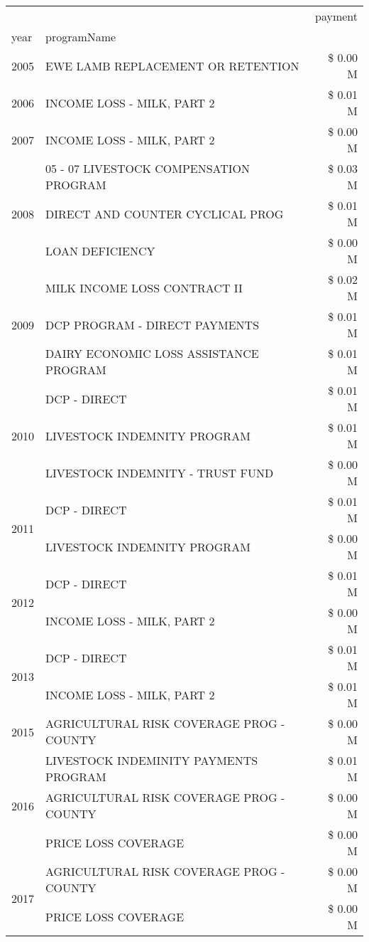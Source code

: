\begin{tabular}{llr}
\toprule
 &  & payment \\
year & programName &  \\
\midrule
2005 & EWE LAMB REPLACEMENT OR RETENTION & \$ 0.00 M \\
\cline{1-3}
2006 & INCOME LOSS - MILK, PART 2 & \$ 0.01 M \\
\cline{1-3}
2007 & INCOME LOSS - MILK, PART 2 & \$ 0.00 M \\
\cline{1-3}
\multirow[t]{3}{*}{2008} & 05 - 07 LIVESTOCK COMPENSATION PROGRAM & \$ 0.03 M \\
 & DIRECT AND COUNTER CYCLICAL PROG & \$ 0.01 M \\
 & LOAN DEFICIENCY & \$ 0.00 M \\
\cline{1-3}
\multirow[t]{3}{*}{2009} & MILK INCOME LOSS CONTRACT II & \$ 0.02 M \\
 & DCP PROGRAM - DIRECT PAYMENTS & \$ 0.01 M \\
 & DAIRY ECONOMIC LOSS ASSISTANCE PROGRAM & \$ 0.01 M \\
\cline{1-3}
\multirow[t]{3}{*}{2010} & DCP - DIRECT & \$ 0.01 M \\
 & LIVESTOCK INDEMNITY PROGRAM & \$ 0.01 M \\
 & LIVESTOCK INDEMNITY - TRUST FUND & \$ 0.00 M \\
\cline{1-3}
\multirow[t]{2}{*}{2011} & DCP - DIRECT & \$ 0.01 M \\
 & LIVESTOCK INDEMNITY PROGRAM & \$ 0.00 M \\
\cline{1-3}
\multirow[t]{2}{*}{2012} & DCP - DIRECT & \$ 0.01 M \\
 & INCOME LOSS - MILK, PART 2 & \$ 0.00 M \\
\cline{1-3}
\multirow[t]{2}{*}{2013} & DCP - DIRECT & \$ 0.01 M \\
 & INCOME LOSS - MILK, PART 2 & \$ 0.01 M \\
\cline{1-3}
2015 & AGRICULTURAL RISK COVERAGE PROG - COUNTY & \$ 0.00 M \\
\cline{1-3}
\multirow[t]{3}{*}{2016} & LIVESTOCK INDEMINITY PAYMENTS PROGRAM & \$ 0.01 M \\
 & AGRICULTURAL RISK COVERAGE PROG - COUNTY & \$ 0.00 M \\
 & PRICE LOSS COVERAGE & \$ 0.00 M \\
\cline{1-3}
\multirow[t]{2}{*}{2017} & AGRICULTURAL RISK COVERAGE PROG - COUNTY & \$ 0.00 M \\
 & PRICE LOSS COVERAGE & \$ 0.00 M \\

\end{tabular}
